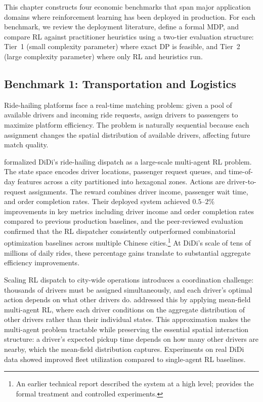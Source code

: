 
This chapter constructs four economic benchmarks that span major application domains where reinforcement learning has been deployed in production. For each benchmark, we review the deployment literature, define a formal MDP, and compare RL against practitioner heuristics using a two-tier evaluation structure: Tier~1 (small complexity parameter) where exact DP is feasible, and Tier~2 (large complexity parameter) where only RL and heuristics run.


\subsection{Benchmark 1: Transportation and Logistics}
\label{sec:benchmark_dispatch}

Ride-hailing platforms face a real-time matching problem: given a pool of available drivers and incoming ride requests, assign drivers to passengers to maximize platform efficiency. The problem is naturally sequential because each assignment changes the spatial distribution of available drivers, affecting future match quality.

\citet{Qin2021dispatch} formalized DiDi's ride-hailing dispatch as a large-scale multi-agent RL problem. The state space encodes driver locations, passenger request queues, and time-of-day features across a city partitioned into hexagonal zones. Actions are driver-to-request assignments. The reward combines driver income, passenger wait time, and order completion rates. Their deployed system achieved $0.5$--$2\%$ improvements in key metrics including driver income and order completion rates compared to previous production baselines, and the peer-reviewed evaluation confirmed that the RL dispatcher consistently outperformed combinatorial optimization baselines across multiple Chinese cities.\footnote{An earlier technical report \citep{DiDi2019} described the system at a high level; \citet{Qin2021dispatch} provides the formal treatment and controlled experiments.} At DiDi's scale of tens of millions of daily rides, these percentage gains translate to substantial aggregate efficiency improvements.

Scaling RL dispatch to city-wide operations introduces a coordination challenge: thousands of drivers must be assigned simultaneously, and each driver's optimal action depends on what other drivers do. \citet{Li2019ridesharing} addressed this by applying mean-field multi-agent RL, where each driver conditions on the aggregate distribution of other drivers rather than their individual states. This approximation makes the multi-agent problem tractable while preserving the essential spatial interaction structure: a driver's expected pickup time depends on how many other drivers are nearby, which the mean-field distribution captures. Experiments on real DiDi data showed improved fleet utilization compared to single-agent RL baselines.

